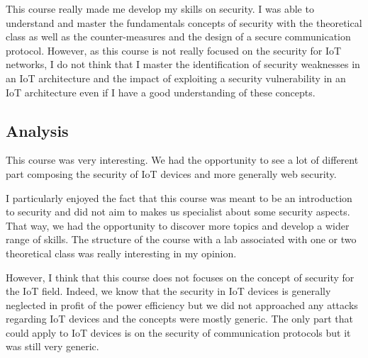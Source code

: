 This course really made me develop my skills on security. I was able to understand and master the fundamentals concepts of security with the theoretical class as well as the counter-measures and the design of a secure communication protocol. However, as this course is not really focused on the security for IoT networks, I do not think that I master the identification of security weaknesses in an IoT architecture and the impact of exploiting a security vulnerability in an IoT architecture even if I have a good understanding of these concepts.

\subsection{Analysis}

This course was very interesting. We had the opportunity to see a lot of different part composing the security of IoT devices and more generally web security.
\\\par
I particularly enjoyed the fact that this course was meant to be an introduction to security and did not aim to makes us specialist about some security aspects. That way, we had the opportunity to discover more topics and develop a wider range of skills. The structure of the course with a lab associated with one or two theoretical class was really interesting in my opinion.  

However, I think that this course does not focuses on the concept of security for the IoT field. Indeed, we know that the security in IoT devices is generally neglected in profit of the power efficiency but we did not approached any attacks regarding IoT devices and the concepts were mostly generic. The only part that could apply to IoT devices is on the security of communication protocols but it was still very generic. 